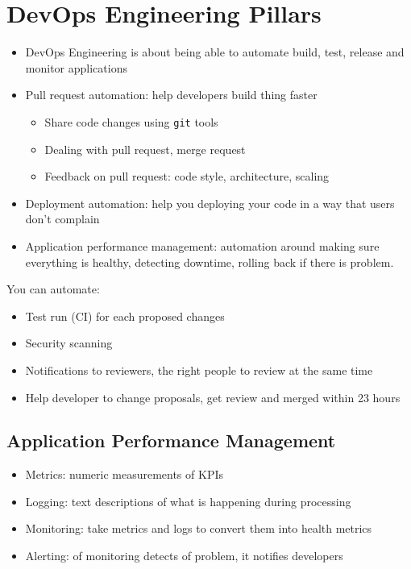 \section{DevOps Engineering Pillars}
\begin{itemize}
	\item DevOps Engineering is about being able to automate build, test, release and monitor applications
	\item Pull request automation: help developers build thing faster
	\begin{itemize}
		\item Share code changes using \texttt{git} tools
		\item Dealing with pull request, merge request
		\item Feedback on pull request: code style, architecture, scaling
	\end{itemize}
	\item Deployment automation: help you deploying your code in a way that users don't complain
	\item Application performance management: automation around making sure everything is healthy, detecting downtime, rolling back if there is problem.
\end{itemize}

You can automate:
\begin{itemize}
	\item Test run (\ac{CI}) for each proposed changes
	\item Security scanning
	\item Notifications to reviewers, the right people to review at the same time
	\item Help developer to change proposals, get review and merged within 23 hours
\end{itemize}

\subsection{Application Performance Management}
\begin{itemize}
	\item Metrics: numeric measurements of KPIs
	\item Logging: text descriptions of what is happening during processing
	\item Monitoring: take metrics and logs to convert them into health metrics
	\item Alerting: of monitoring detects of problem, it notifies developers
\end{itemize}

